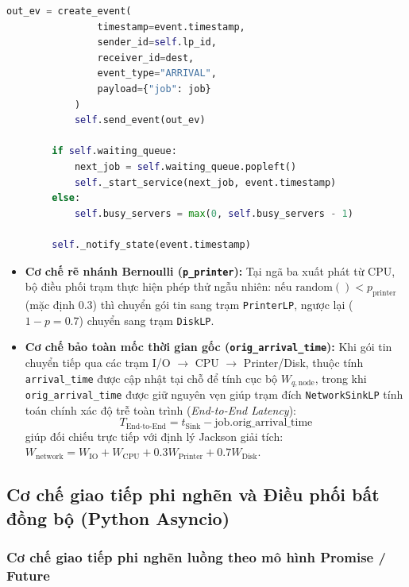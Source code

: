 \begin{lstlisting}[language=Python, caption={Hiện thực rẽ nhánh xác suất trong BranchingServerLP (bkitevsim/models/network.py)}, label={lst:branching-server}]
            out_ev = create_event(
                timestamp=event.timestamp,
                sender_id=self.lp_id,
                receiver_id=dest,
                event_type="ARRIVAL",
                payload={"job": job}
            )
            self.send_event(out_ev)

        if self.waiting_queue:
            next_job = self.waiting_queue.popleft()
            self._start_service(next_job, event.timestamp)
        else:
            self.busy_servers = max(0, self.busy_servers - 1)

        self._notify_state(event.timestamp)
\end{lstlisting}

\begin{itemize}[leftmargin=1.5em, itemsep=2pt]
\item \textbf{Cơ chế rẽ nhánh Bernoulli (\texttt{p\_printer}):} Tại ngã ba xuất phát từ CPU, bộ điều phối trạm thực hiện phép thử ngẫu nhiên: nếu $\text{random}() < p_{\text{printer}}$ (mặc định $0.3$) thì chuyển gói tin sang trạm \texttt{PrinterLP}, ngược lại ($1 - p = 0.7$) chuyển sang trạm \texttt{DiskLP}.
\item \textbf{Cơ chế bảo toàn mốc thời gian gốc (\texttt{orig\_arrival\_time}):} Khi gói tin chuyển tiếp qua các trạm I/O $\to$ CPU $\to$ Printer/Disk, thuộc tính \texttt{arrival\_time} được cập nhật tại chỗ để tính cục bộ $W_{q,\text{node}}$, trong khi \texttt{orig\_arrival\_time} được giữ nguyên vẹn giúp trạm đích \texttt{NetworkSinkLP} tính toán chính xác độ trễ toàn trình (\textit{End-to-End Latency}):
\begin{equation}
T_{\text{End-to-End}} = t_{\text{Sink}} - \text{job.orig\_arrival\_time}
\end{equation}
giúp đối chiếu trực tiếp với định lý Jackson giải tích: $W_{\text{network}} = W_{\text{IO}} + W_{\text{CPU}} + 0.3 W_{\text{Printer}} + 0.7 W_{\text{Disk}}$.
\end{itemize}

\subsection{Cơ chế giao tiếp phi nghẽn và Điều phối bất đồng bộ (Python Asyncio)}
\label{subsec:asyncio-implementation}

\subsubsection{Cơ chế giao tiếp phi nghẽn luồng theo mô hình Promise / Future}
\label{subsubsec:promise-future}

